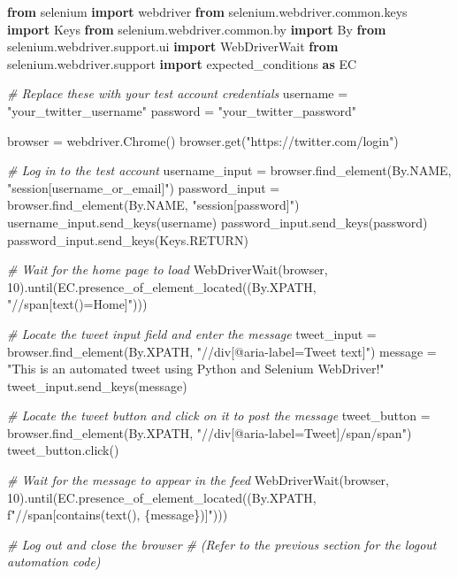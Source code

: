 \documentclass[
  paper=a4,
  ,captions=tableheading
]{scrartcl}
\newenvironment{Shaded}{}{}
\newcommand{\CommentTok}[1]{\textcolor[rgb]{0.38,0.63,0.69}{\textit{#1}}}
\newcommand{\DecValTok}[1]{\textcolor[rgb]{0.25,0.63,0.44}{#1}}
\newcommand{\ImportTok}[1]{\textcolor[rgb]{0.00,0.50,0.00}{\textbf{#1}}}
\newcommand{\NormalTok}[1]{#1}
\newcommand{\OperatorTok}[1]{\textcolor[rgb]{0.40,0.40,0.40}{#1}}
\newcommand{\SpecialCharTok}[1]{\textcolor[rgb]{0.25,0.44,0.63}{#1}}
\newcommand{\SpecialStringTok}[1]{\textcolor[rgb]{0.73,0.40,0.53}{#1}}
\newcommand{\StringTok}[1]{\textcolor[rgb]{0.25,0.44,0.63}{#1}}
\begin{document}
\begin{Shaded}
\begin{Highlighting}[]
\ImportTok{from}\NormalTok{ selenium }\ImportTok{import}\NormalTok{ webdriver}
\ImportTok{from}\NormalTok{ selenium.webdriver.common.keys }\ImportTok{import}\NormalTok{ Keys}
\ImportTok{from}\NormalTok{ selenium.webdriver.common.by }\ImportTok{import}\NormalTok{ By}
\ImportTok{from}\NormalTok{ selenium.webdriver.support.ui }\ImportTok{import}\NormalTok{ WebDriverWait}
\ImportTok{from}\NormalTok{ selenium.webdriver.support }\ImportTok{import}\NormalTok{ expected\_conditions }\ImportTok{as}\NormalTok{ EC}

\CommentTok{\# Replace these with your test account credentials}
\NormalTok{username }\OperatorTok{=} \StringTok{"your\_twitter\_username"}
\NormalTok{password }\OperatorTok{=} \StringTok{"your\_twitter\_password"}

\NormalTok{browser }\OperatorTok{=}\NormalTok{ webdriver.Chrome()}
\NormalTok{browser.get(}\StringTok{"https://twitter.com/login"}\NormalTok{)}

\CommentTok{\# Log in to the test account}
\NormalTok{username\_input }\OperatorTok{=}\NormalTok{ browser.find\_element(By.NAME, }\StringTok{"session[username\_or\_email]"}\NormalTok{)}
\NormalTok{password\_input }\OperatorTok{=}\NormalTok{ browser.find\_element(By.NAME, }\StringTok{"session[password]"}\NormalTok{)}
\NormalTok{username\_input.send\_keys(username)}
\NormalTok{password\_input.send\_keys(password)}
\NormalTok{password\_input.send\_keys(Keys.RETURN)}

\CommentTok{\# Wait for the home page to load}
\NormalTok{WebDriverWait(browser, }\DecValTok{10}\NormalTok{).until(EC.presence\_of\_element\_located((By.XPATH, }\StringTok{"//span[text()=\textquotesingle{}Home\textquotesingle{}]"}\NormalTok{)))}

\CommentTok{\# Locate the tweet input field and enter the message}
\NormalTok{tweet\_input }\OperatorTok{=}\NormalTok{ browser.find\_element(By.XPATH, }\StringTok{"//div[@aria{-}label=\textquotesingle{}Tweet text\textquotesingle{}]"}\NormalTok{)}
\NormalTok{message }\OperatorTok{=} \StringTok{"This is an automated tweet using Python and Selenium WebDriver!"}
\NormalTok{tweet\_input.send\_keys(message)}

\CommentTok{\# Locate the tweet button and click on it to post the message}
\NormalTok{tweet\_button }\OperatorTok{=}\NormalTok{ browser.find\_element(By.XPATH, }\StringTok{"//div[@aria{-}label=\textquotesingle{}Tweet\textquotesingle{}]/span/span"}\NormalTok{)}
\NormalTok{tweet\_button.click()}

\CommentTok{\# Wait for the message to appear in the feed}
\NormalTok{WebDriverWait(browser, }\DecValTok{10}\NormalTok{).until(EC.presence\_of\_element\_located((By.XPATH, }\SpecialStringTok{f"//span[contains(text(), \textquotesingle{}}\SpecialCharTok{\{}\NormalTok{message}\SpecialCharTok{\}}\SpecialStringTok{\textquotesingle{})]"}\NormalTok{)))}

\CommentTok{\# Log out and close the browser}
\CommentTok{\# (Refer to the previous section for the logout automation code)}
\end{Highlighting}
\end{Shaded}
\end{document}
